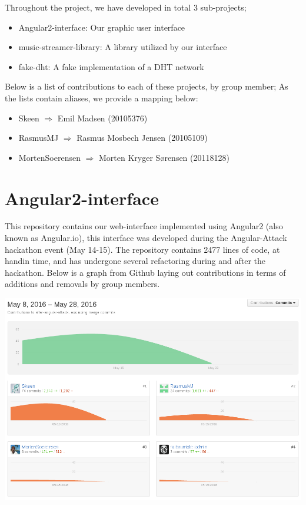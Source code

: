 Throughout the project, we have developed in total 3 sub-projects;
\begin{itemize}
\item Angular2-interface: Our graphic user interface
\item music-streamer-library: A library utilized by our interface
\item fake-dht: A fake implementation of a DHT network
\end{itemize}
Below is a list of contributions to each of these projects, by group member;
As the lists contain aliases, we provide a mapping below:
\begin{itemize}
    \item Skeen $\Rightarrow$ Emil Madsen (20105376)
    \item RasmusMJ $\Rightarrow$ Rasmus Mosbech Jensen (20105109)
    \item MortenSoerensen $\Rightarrow$ Morten Kryger Sørensen (20118128)
\end{itemize}

\section{Angular2-interface}
This repository contains our web-interface implemented using Angular2 (also 
known as Angular.io), this interface was developed during the Angular-Attack
hackathon event (May 14-15).
\newline\newline
The repository contains 2477 lines of code, at handin time, and has undergone 
several refactoring during and after the hackathon.
\newline\newline
Below is a graph from Github laying out contributions in terms of additions and
removals by group members.

\includegraphics[width=\linewidth]{gfx/Angular-interface}

